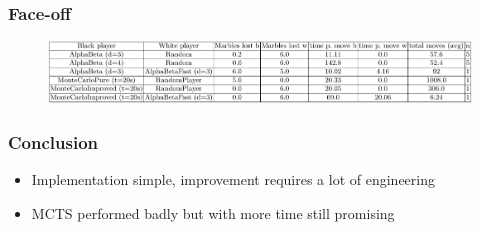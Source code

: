 \documentclass{beamer}
\begin{document}
\begin{frame}
	\frametitle{Face-off}
	\begin{adjustwidth}{-5in}{-5in}%
		\begin{figure}
			\centering
			\includegraphics[width=12cm, keepaspectratio]{face_off_table.png}
		\end{figure}
	\end{adjustwidth}
\end{frame}

\begin{frame}
	\frametitle{Conclusion}
	\begin{itemize}
		\item Implementation simple, improvement requires a lot of engineering
		\item MCTS performed badly but with more time still promising
	\end{itemize}
\end{frame}
\end{document}
